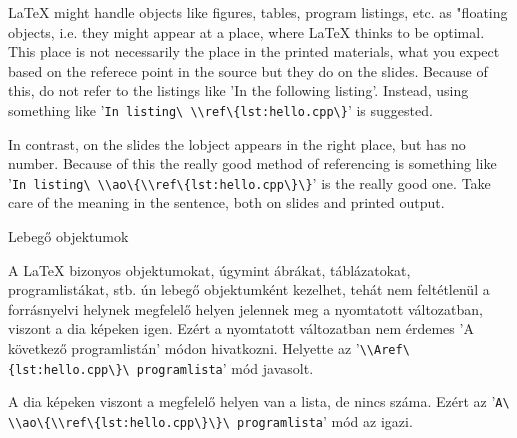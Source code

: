
{
\LaTeX{} might handle objects like figures, tables, program listings, etc.
as "floating objects, i.e. they might appear at a place,
where \LaTeX{} thinks to be optimal.
This place is not necessarily  the place in the printed materials,
what you expect based on the referece point in the source
but they do on the slides.
Because of this, do not refer to the listings like
'In the following listing'.
Instead, using something like  '\lstinline|In listing\ \\ref\{lst:hello.cpp\}|' is suggested.

In contrast, on the slides the lobject appears in the right place,
but has no number. Because of this the really good method of referencing
is something like '\lstinline|In listing\ \\ao\{\\ref\{lst:hello.cpp\}\}|' 
is the really good one.
Take care of the meaning in the sentence, both on slides and printed output.

}
{Lebegő objektumok}
{
A \LaTeX{} bizonyos objektumokat, úgymint ábrákat, táblázatokat, programlistákat, stb. ún
lebegő objektumként kezelhet, tehát nem feltétlenül a forrásnyelvi helynek 
megfelelő helyen jelennek meg a nyomtatott változatban, viszont a dia képeken igen.
Ezért a nyomtatott változatban nem érdemes 'A következő programlistán' módon hivatkozni. Helyette
az '\lstinline|\\Aref\{lst:hello.cpp\}\ programlista|' mód javasolt.

A dia képeken viszont  a megfelelő helyen van a lista, de nincs száma.
Ezért az '\lstinline|A\ \\ao\{\\ref\{lst:hello.cpp\}\}\ programlista|' mód az igazi.
}